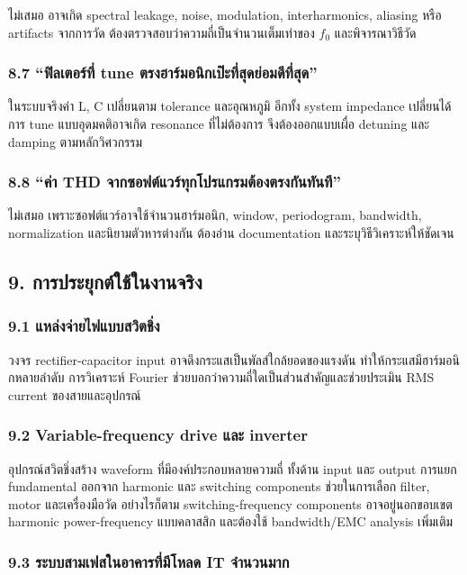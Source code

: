 ไม่เสมอ อาจเกิด spectral leakage, noise, modulation, interharmonics, aliasing หรือ artifacts จากการวัด ต้องตรวจสอบว่าความถี่เป็นจำนวนเต็มเท่าของ $f_0$ และพิจารณาวิธีวัด

\subsubsection{8.7 “ฟิลเตอร์ที่ tune ตรงฮาร์มอนิกเป๊ะที่สุดย่อมดีที่สุด”}

ในระบบจริงค่า L, C เปลี่ยนตาม tolerance และอุณหภูมิ อีกทั้ง system impedance เปลี่ยนได้ การ tune แบบอุดมคติอาจเกิด resonance ที่ไม่ต้องการ จึงต้องออกแบบเผื่อ detuning และ damping ตามหลักวิศวกรรม

\subsubsection{8.8 “ค่า THD จากซอฟต์แวร์ทุกโปรแกรมต้องตรงกันทันที”}

ไม่เสมอ เพราะซอฟต์แวร์อาจใช้จำนวนฮาร์มอนิก, window, periodogram, bandwidth, normalization และนิยามตัวหารต่างกัน ต้องอ่าน documentation และระบุวิธีวิเคราะห์ให้ชัดเจน



\subsection{9. การประยุกต์ใช้ในงานจริง}

\subsubsection{9.1 แหล่งจ่ายไฟแบบสวิตชิ่ง}

วงจร rectifier-capacitor input อาจดึงกระแสเป็นพัลส์ใกล้ยอดของแรงดัน ทำให้กระแสมีฮาร์มอนิกหลายลำดับ การวิเคราะห์ Fourier ช่วยบอกว่าความถี่ใดเป็นส่วนสำคัญและช่วยประเมิน RMS current ของสายและอุปกรณ์

\subsubsection{9.2 Variable-frequency drive และ inverter}

อุปกรณ์สวิตชิ่งสร้าง waveform ที่มีองค์ประกอบหลายความถี่ ทั้งด้าน input และ output การแยก fundamental ออกจาก harmonic และ switching components ช่วยในการเลือก filter, motor และเครื่องมือวัด อย่างไรก็ตาม switching-frequency components อาจอยู่นอกขอบเขต harmonic power-frequency แบบคลาสสิก และต้องใช้ bandwidth/EMC analysis เพิ่มเติม

\subsubsection{9.3 ระบบสามเฟสในอาคารที่มีโหลด IT จำนวนมาก}

